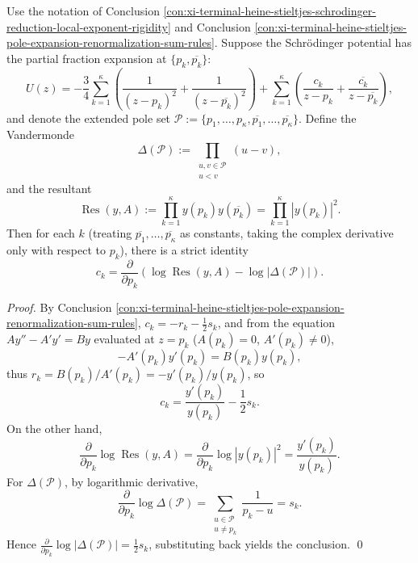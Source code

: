 \begin{conclusion}\label{con:xi-terminal-potential-tau-gradient-resultant-vandermonde}
Use the notation of Conclusion \ref{con:xi-terminal-heine-stieltjes-schrodinger-reduction-local-exponent-rigidity} and
Conclusion \ref{con:xi-terminal-heine-stieltjes-pole-expansion-renormalization-sum-rules}.
Suppose the Schr\"odinger potential has the partial fraction expansion at \(\{p_k,\overline{p_k}\}\):
\[
U(z)=-\frac{3}{4}\sum_{k=1}^{\kappa}\left(\frac{1}{(z-p_k)^2}+\frac{1}{(z-\overline{p_k})^2}\right)
+\sum_{k=1}^{\kappa}\left(\frac{c_k}{z-p_k}+\frac{\overline{c_k}}{z-\overline{p_k}}\right),
\]
and denote the extended pole set
\(
\mathcal P:=\{p_1,\dots,p_\kappa,\overline{p_1},\dots,\overline{p_\kappa}\}
\).
Define the Vandermonde
\[
\Delta(\mathcal P):=\prod_{\substack{u,v\in\mathcal P\\ u<v}}(u-v),
\]
and the resultant
\[
\operatorname{Res}(y,A):=\prod_{k=1}^{\kappa}y(p_k)y(\overline{p_k})
=\prod_{k=1}^{\kappa}|y(p_k)|^2.
\]
Then for each \(k\) (treating \(\overline{p_1},\dots,\overline{p_\kappa}\) as constants, taking the complex derivative only with respect to \(p_k\)), there is a strict identity
\[
\boxed{\;
c_k=\frac{\partial}{\partial p_k}\left(\log \operatorname{Res}(y,A)-\log|\Delta(\mathcal P)|\right). \;}
\]
\end{conclusion}
\begin{proof}
By Conclusion \ref{con:xi-terminal-heine-stieltjes-pole-expansion-renormalization-sum-rules},
\(
c_k=-r_k-\tfrac12 s_k
\),
and from the equation \(Ay''-A'y'=By\) evaluated at \(z=p_k\) (\(A(p_k)=0\), \(A'(p_k)\neq 0\)),
\[
-A'(p_k)y'(p_k)=B(p_k)y(p_k),
\]
thus \(r_k=B(p_k)/A'(p_k)=-y'(p_k)/y(p_k)\), so
\[
c_k=\frac{y'(p_k)}{y(p_k)}-\frac12 s_k.
\]
On the other hand,
\[
\frac{\partial}{\partial p_k}\log\operatorname{Res}(y,A)
=\frac{\partial}{\partial p_k}\log|y(p_k)|^2
=\frac{y'(p_k)}{y(p_k)}.
\]
For \(\Delta(\mathcal P)\), by logarithmic derivative,
\[
\frac{\partial}{\partial p_k}\log \Delta(\mathcal P)
=\sum_{\substack{u\in\mathcal P\\ u\neq p_k}}\frac{1}{p_k-u}
=s_k.
\]
Hence
\(
\frac{\partial}{\partial p_k}\log|\Delta(\mathcal P)|
=\tfrac12 s_k
\),
substituting back yields the conclusion. \qed
\end{proof}


